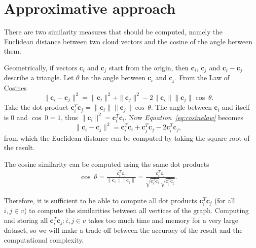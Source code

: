 \documentclass[12pt]{report}
\begin{document}
%
%
\section{Approximative approach}

%
%
There are two similarity measures that should be computed, namely the Euclidean
distance between two cloud vectors and the cosine of the angle between them.

Geometrically, if vectors $\bm{c}_i$ and $\bm{c}_j$ start from the origin, then
$\bm{c}_i$, $\bm{c}_j$ and $\bm{c}_i-\bm{c}_j$ describe a triangle. Let $\theta$
be the angle between $\bm{c}_i$ and $\bm{c}_j$. From the Law of Cosines
%
\begin{equation}
  \label{eq:cosinelaw}
  \|\bm{c}_i-\bm{c}_j\|^2 = \|\bm{c}_i\|^2 + \|\bm{c}_j\|^2 - 2 \|\bm{c}_i\|
  \|\bm{c}_j\| \cos \ \theta.
\end{equation}
%
Take the dot product $\bm{c}^T_i\bm{c}_j = \| \bm{c}_i \| \| \bm{c}_j \| \cos \ \theta$.
The angle between $\bm{c}_i$ and itself is $0$ and $\cos \ 0=1$, thus
$\|\bm{c}_i\|^2 = \bm{c}^T_i\bm{c}_i$. Now \emph{Equation~\ref{eq:cosinelaw}} becomes
%
\begin{equation}
  \label{eq:norm-equation}
  \|\bm{c}_i-\bm{c}_j\|^2 = \bm{c}^T_i\bm{c}_i + \bm{c}^T_j\bm{c}_j - 2 \bm{c}^T_i\bm{c}_j,
\end{equation}
%
from which the Euclidean distance can be computed by taking the square root of the
result.

The cosine similarity can be computed using the same dot products
\begin{align}
  \cos \ \theta = \frac{\bm{c}^T_i\bm{c}_j}{\|\bm{c}_i\|\|\bm{c}_j\|} =
  \frac{\bm{c}^T_i\bm{c}_j}{\sqrt{\bm{c}^T_i\bm{c}_i} \ \sqrt{\bm{c}^T_j\bm{c}_j}}.
\end{align}

Therefore, it is sufficient to be able to compute all dot products $\bm{c}^T_i\bm{c}_j$
(for all $i, j \in v$) to compute the similarities between all vertices of the
graph. Computing and storing all $\bm{c}^T_i\bm{c}_j; i,j \in v$ takes too much
time and memory for a very large dataset, so we will make a trade-off between the
accuracy of the result and the computational complexity.
\end{document}
